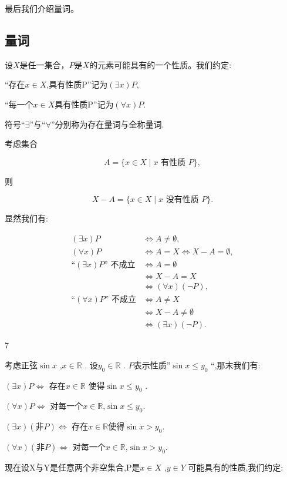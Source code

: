 最后我们介绍量词。

\subsection{量词}

设$X$是任一集合，$P$是$X$的元素可能具有的一个性质。我们约定:

``存在\(x\in X\),具有性质P''记为\((\exists x)P\),

``每一个\(x\in X\)具有性质P''记为\((\forall x)P\).

符号``\(\exists\)''与``\(\forall\)''分别称为存在量词与全称量词.

考虑集合

\[A=\{x\in X\mid x\text{ 有性质 }P\},\]

则

\[X-A=\{x\in X\mid x\text{ 没有性质 }P\}.\]

显然我们有:


\begin{align*}
	(\exists x)P &\iff A \neq \emptyset, \\
	(\forall x)P &\iff A = X \iff X - A = \emptyset, \\
	\text{``$(\exists x)P$'' 不成立} &\iff A = \emptyset \\
	&\iff X - A = X \\
	&\iff (\forall x)(\lnot P), \\
	\text{``$(\forall x)P$'' 不成立} &\iff A \neq X \\
	&\iff X - A \neq \emptyset \\
	&\iff (\exists x)(\lnot P).
\end{align*}

\begin{sourceexample}{7}

考虑正弦\(\sin x\) ,\(x \in \mathbb{R}\) . 设\(y_0 \in \mathbb{R}\) . $P$表示性质''\(\sin x \leq y_0\) ``,那末我们有:

\((\exists x)P \iff\) 存在\(x \in \mathbb{R}\) 使得\(\sin x \leq y_0\) .

\((\forall x)P\iff\) 对每一个\(x\in\mathbb{R}\),\(\sin x\leq y_0\).

\((\exists x)(\text{非}P)\iff\) 存在\(x\in\mathbb{R}\)使得\(\sin x>y_0\).

\((\forall x)(\text{非}P)\iff\) 对每一个\(x\in\mathbb{R}\),\(\sin x>y_0\).


\end{sourceexample}


现在设X与Y是任意两个非空集合,P是\(x \in X\) ,\(y \in Y\) 可能具有的性质,我们约定:

